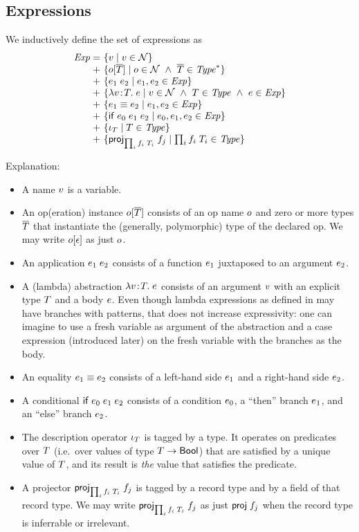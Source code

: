 \subsection{Expressions}

We inductively define the set of expressions as
\[
\setdefVIIIoI
 {\Expr}
 {+}
 {\setST{\var}{\var\in\Nam}}
 {\setST{\opO}{\onam\in\Nam\AND\typS\in\Seq{\Typ}}}
 {\setST{\appO}{\expr_1,\expr_2\in\Expr}}
 {\setST{\absO}{\var\in\Nam\AND\typ\in\Typ\AND\expr\in\Expr}}
 {\setST{\eqO}{\expr_1,\expr_2\in\Expr}}
 {\setST{\iifO}{\expr_0,\expr_1,\expr_2\in\Expr}}
 {\setST{\descopO}{\typ\in\Typ}}
\setdefVIIIoII
 {+}
 {\setST{\projopO}{\trecO\in\Typ}}
\]

Explanation:
\begin{itemize}
\item
A name $v$ is a variable.
\item
An op(eration) instance $o[\overline{T}]$ consists of an op name $o$ and zero or more
types $\overline{T}$ that instantiate the (generally, polymorphic) type of the
declared op. We may write $o[\epsilon]$ as just $o$.
\item
An application $e_1\;e_2$ consists of a function $e_1$ juxtaposed to an
argument $e_2$.
\item
A (lambda) abstraction $\lambda v\!:\!T.\;e$ consists of an argument $v$ with an explicit
type $T$ and a body $e$. Even though lambda expressions as defined in
\cite{lm} may have branches with patterns, that does not increase
expressivity: one can imagine to use a fresh variable as argument of the
abstraction and a case expression (introduced later) on the fresh variable
with the branches as the body.
\item
An equality $e_1\equiv e_2$ consists of a left-hand side $e_1$ and a right-hand
side $e_2$.
\item
A conditional $\mathsf{if}\;e_0\;e_1\;e_2$ consists of a condition $e_0$, a ``then'' branch
$e_1$, and an ``else'' branch $e_2$.
\item
The description operator $\iota_{T}$ is tagged by a type. It operates on
predicates over $T$ (i.e.\ over values of type $T\to\mathsf{Bool}$) that
are satisfied by a unique value of $T$, and its result is \emph{the} value
that satisfies the predicate.
\item
A projector $\mathsf{proj}_{\prod_{i}f_i\;T_i}\;{f_j}$ is tagged by a record type and by a field of that
record type. We may write $\mathsf{proj}_{\prod_{i}f_i\;T_i}\;{f_j}$ as just $\mathsf{proj}\;{f_j}$ when the record type is
inferrable or irrelevant.

\end{itemize}
